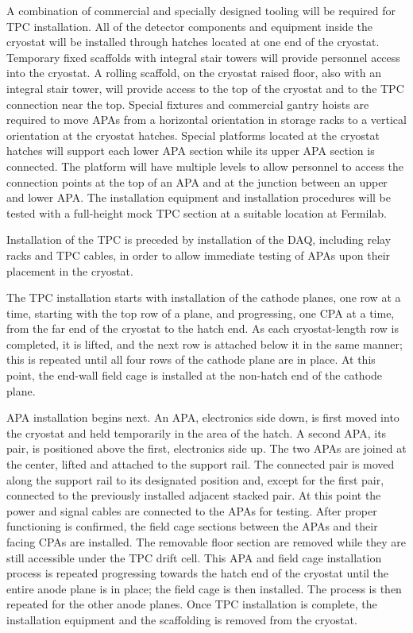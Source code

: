 A combination of commercial and specially designed tooling will be
required for TPC installation. All of the detector components and
equipment inside the cryostat will be installed  through hatches
located at one end of the cryostat.  Temporary fixed scaffolds with integral
stair towers will  provide personnel access
into the cryostat. A rolling scaffold, on the cryostat raised   floor, also with an integral stair tower,
will provide access to the top
of the cryostat and to the TPC connection near the top.  Special fixtures
and commercial gantry hoists are required to move APAs from a
horizontal orientation in storage racks to a vertical orientation at
the cryostat hatches. Special platforms located at the
cryostat hatches will support each lower APA section while its upper APA
section is connected. The platform will have multiple levels to allow
personnel to access the connection points at the top of an APA and at the
junction between an upper and lower APA. The installation equipment
and installation procedures will be tested with a full-height mock TPC
section at a suitable location at Fermilab.

%
Installation of the TPC is preceded by installation of the DAQ, including relay racks and TPC cables, 
 in order to allow immediate testing of APAs upon their placement in the cryostat.

The TPC installation starts with installation of the cathode planes, one 
row at a time, starting with the top row of a plane, and progressing, one CPA at a time, 
from the far end of the
cryostat to the hatch end.  As each cryostat-length row is completed, 
it is lifted, and the next row
is attached below it in the same manner; this is repeated until all four rows of the cathode plane are in place.
At this point, the end-wall field cage is installed at the non-hatch end of
the cathode plane. 

APA installation begins next. %
An APA, electronics side down, is first moved %
into the cryostat and held temporarily in the area of the
hatch. A second APA, its pair, is positioned above 
the first, electronics side up. The two APAs are joined at the
center, lifted and attached to the support rail. The connected pair is 
moved along the support rail to its designated position and, except for the first pair,
connected to the previously installed adjacent stacked pair.  
%
At this point the power and signal
cables are connected to the APAs for testing. After proper functioning
is confirmed, the field cage
sections between the APAs and their facing CPAs are installed. The removable floor
section are removed while they are  still accessible under the TPC
drift cell.  This APA and field cage installation process is repeated progressing towards 
the hatch end of the cryostat until the entire anode plane is in place; the field cage is then
installed. The process is then repeated
for the other anode planes. Once TPC installation is complete, the installation equipment and
the scaffolding is removed from the cryostat.


